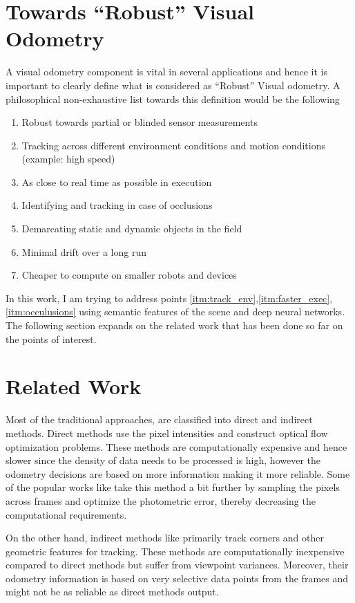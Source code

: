 \documentclass[conference]{IEEEtran}
\begin{document}
\section{Towards ``Robust'' Visual Odometry}
A visual odometry component is vital in several applications and hence it is important to clearly define what is considered as ``Robust'' Visual odometry. A philosophical non-exhaustive list towards this definition would be the following
\begin{enumerate}
    \item \label{itm:partial} Robust towards partial or blinded sensor measurements
    \item \label{itm:track_env}Tracking across different environment conditions and motion conditions (example: high speed)
    \item \label{itm:faster_exec}As close to real time as possible in execution 
    \item \label{itm:occulusions}Identifying and tracking in case of occlusions
    \item \label{itm:static_dynamic}Demarcating static and dynamic objects in the field
    \item \label{itm:no_drift}Minimal drift over a long run
    \item \label{itm:cheap_compute}Cheaper to compute on smaller robots and devices
\end{enumerate}

In this work, I am trying to address points \ref{itm:track_env},\ref{itm:faster_exec},\ref{itm:occulusions} using semantic features of the scene and deep neural networks. The following section expands on the related work that has been done so far on the points of interest.

\section{Related Work}
Most of the traditional approaches, are classified into direct and indirect methods. Direct methods use the pixel intensities and construct optical flow optimization problems. These methods are computationally expensive and hence slower since the density of data needs to be processed is high, however the odometry decisions are based on more information making it more reliable. Some of the popular works like \cite{DSO} take this method a bit further by sampling the pixels across frames and optimize the photometric error, thereby decreasing the computational requirements. 


On the other hand, indirect methods like \cite{orbstereo} primarily track corners and other geometric features for tracking. These methods are computationally inexpensive compared to direct methods but suffer from viewpoint variances. Moreover, their odometry information is based on very selective data points from the frames and might not be as reliable as direct methods output.
\end{document}
